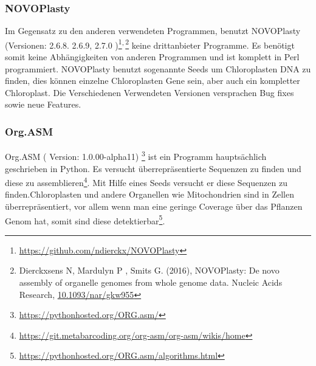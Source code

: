 \documentclass{scrartcl}
\begin{document}
\subsubsection{NOVOPlasty}
\label{sec-2-5-3}
Im Gegensatz zu den anderen verwendeten Programmen, benutzt NOVOPlasty (Versionen: 2.6.8. 2.6.9, 2.7.0 )\footnote{\url{https://github.com/ndierckx/NOVOPlasty}}\textsuperscript{,}\,\footnote{Dierckxsens N, Mardulyn P , Smits G. (2016), NOVOPlasty: De novo assembly of organelle genomes from whole genome data. Nucleic Acids Research, \url{10.1093/nar/gkw955}} keine drittanbieter Programme. Es benötigt somit keine Abhängigkeiten von anderen Programmen
und ist komplett in Perl programmiert. NOVOPlasty benutzt sogenannte Seeds um Chloroplasten DNA zu finden, dies können einzelne Chloroplasten Gene sein, aber auch ein kompletter Chloroplast.
Die Verschiedenen Verwendeten Versionen versprachen Bug fixes sowie neue Features. 
\subsubsection{Org.ASM}
\label{sec-2-5-4}
Org.ASM ( Version: 1.0.00-alpha11) \footnote{\url{https://pythonhosted.org/ORG.asm/}} ist ein Programm hauptsächlich geschrieben in Python. Es versucht überrepräsentierte Sequenzen zu finden und diese zu assemblieren\footnote{\url{https://git.metabarcoding.org/org-asm/org-asm/wikis/home}}. 
Mit Hilfe eines Seeds versucht er diese Sequenzen zu finden.Chloroplasten und andere Organellen wie Mitochondrien sind in Zellen überrepräsentiert, vor allem
wenn man eine geringe Coverage über das Pflanzen Genom hat, somit sind diese detektierbar\footnote{\url{https://pythonhosted.org/ORG.asm/algorithms.html}}.
\end{document}
